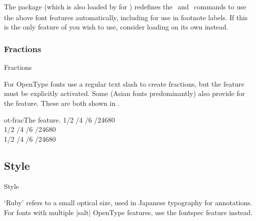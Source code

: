 \documentclass[a4paper]{l3doc}
\begin{document}
The  package
(which is also loaded by  for \XeTeX)
redefines the \cmd\textsubscript\ and
\cmd\textsuperscript\ commands to use the above font features automatically,
including for use in footnote labels.
If this is the only feature of  you wish to use, consider
loading  on its own instead.


\subsubsection{Fractions}

\begin{features}{Fractions}
\end{features}

For OpenType fonts use a regular text slash to create fractions, but
the  feature must be explicitly activated.
Some (Asian fonts predominantly) also provide for the
 feature. These are both shown in .

\begin{Xexample}{ot-frac}{The  feature.}
   1/2 /4 /6 /24680 \\
   1/2 /4 /6 /24680 \\
   1/2 /4 /6 /24680 \\
\end{Xexample}

\subsection{Style}
\label{sec:ot-feat-style}

\begin{features}{Style}
\end{features}

`Ruby' refers to a small optical size, used in
Japanese typography for annotations.
For fonts with multiple |salt| OpenType features,
use the fontspec  feature instead.
\end{document}

